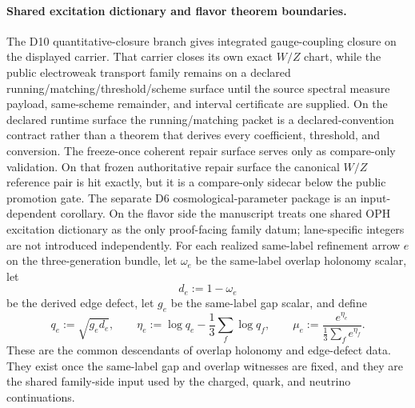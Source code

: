 \documentclass[11pt]{article}
\begin{document}
\paragraph{Shared excitation dictionary and flavor theorem boundaries.}
The D10 quantitative-closure branch gives integrated gauge-coupling closure on the displayed carrier. That carrier closes its own exact \(W/Z\) chart, while the public electroweak transport family remains on a declared running/matching/threshold/scheme surface until the source spectral measure payload, same-scheme remainder, and interval certificate are supplied. On the declared runtime surface the running/matching packet is a declared-convention contract rather than a theorem that derives every coefficient, threshold, and conversion. The freeze-once coherent repair surface serves only as compare-only validation. On that frozen authoritative repair surface the canonical \(W/Z\) reference pair is hit exactly, but it is a compare-only sidecar below the public promotion gate. The separate D6 cosmological-parameter package is an input-dependent corollary. On the flavor side the manuscript treats one shared OPH excitation dictionary as the only proof-facing family datum; lane-specific integers are not introduced independently. For each realized same-label refinement arrow \(e\) on the three-generation bundle, let \(\omega_e\) be the same-label overlap holonomy scalar, let
\[
d_e:=1-\omega_e
\]
be the derived edge defect, let \(g_e\) be the same-label gap scalar, and define
\[
q_e:=\sqrt{g_e d_e},
\qquad
\eta_e:=\log q_e-\frac13\sum_f \log q_f,
\qquad
\mu_e:=\frac{e^{\eta_e}}{\frac13\sum_f e^{\eta_f}}.
\]
These are the common descendants of overlap holonomy and edge-defect data. They exist once the same-label gap and overlap witnesses are fixed, and they are the shared family-side input used by the charged, quark, and neutrino continuations.
\end{document}
